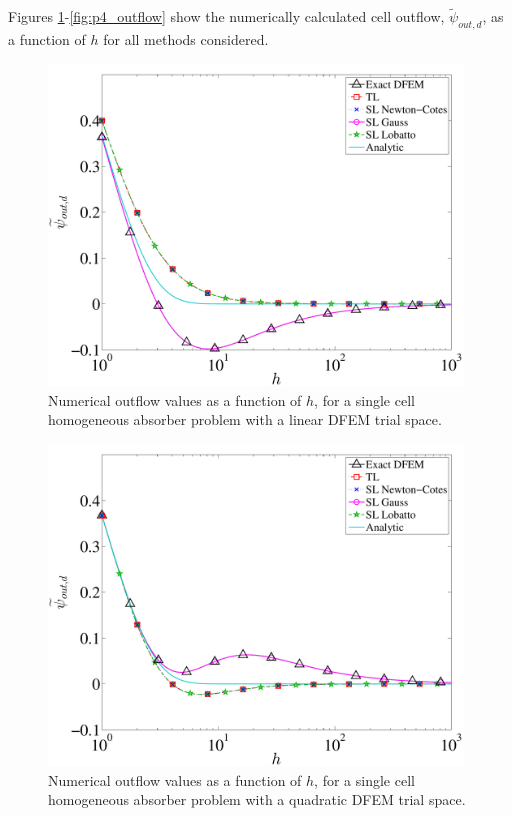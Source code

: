Figures \ref{fig:p1_outflow}-\ref{fig:p4_outflow} show the numerically calculated cell outflow, $\widetilde{\psi}_{out,d}$, as a function 
of $h$ for all methods considered. 
\begin{figure}[!htp]
\centering
\includegraphics[width=11cm]{chapter2_constant_xs/P1_Outflow_AllMeth-eps-converted-to.pdf}
\caption{Numerical outflow values  as a function of $h$, for a single cell homogeneous absorber problem with a linear DFEM trial space.}
\label{fig:p1_outflow}
\end{figure}
\begin{figure}[!hbp]
\centering
\includegraphics[width=11cm]{chapter2_constant_xs/P2_Outflow_AllMeth-eps-converted-to.pdf}
\caption{Numerical outflow values  as a function of $h$, for a single cell homogeneous absorber problem with a quadratic DFEM trial space.}
\label{fig:p2_outflow}
\end{figure}
